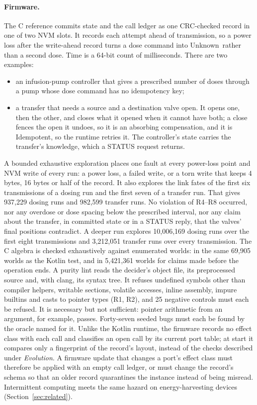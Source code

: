 \documentclass[11pt]{article}
\theoremstyle{definition}
\theoremstyle{plain}
\newcommand{\Unknown}{\textsf{Unknown}}
\newcommand{\Idem}{\textsf{Idempotent}}
\begin{document}
\paragraph{Firmware.} The C reference commits state and the call ledger as one CRC-checked record in one of two NVM slots. It records each attempt ahead of transmission, so a power loss after the write-ahead record turns a dose command into \Unknown\ rather than a second dose. Time is a 64-bit count of milliseconds. There are two examples:
\begin{itemize}[nosep]
  \item an infusion-pump controller that gives a prescribed number of doses through a pump whose dose command has no idempotency key;
  \item a transfer that needs a source and a destination valve open. It opens one, then the other, and closes what it opened when it cannot have both; a close fences the open it undoes, so it is an absorbing compensation, and it is \Idem, so the runtime retries it. The controller's state carries the transfer's knowledge, which a STATUS request returns.
\end{itemize}
A bounded exhaustive exploration places one fault at every power-loss point and NVM write of every run: a power loss, a failed write, or a torn write that keeps 4 bytes, 16 bytes or half of the record. It also explores the link fates of the first six transmissions of a dosing run and the first seven of a transfer run. That gives 937{,}229 dosing runs and 982{,}599 transfer runs. No violation of R4--R8 occurred, nor any overdose or dose spacing below the prescribed interval, nor any claim about the transfer, in committed state or in a STATUS reply, that the valves' final positions contradict. A deeper run explores 10{,}006{,}169 dosing runs over the first eight transmissions and 3{,}212{,}051 transfer runs over every transmission. The C algebra is checked exhaustively against enumerated worlds: in the same 69{,}905 worlds as the Kotlin test, and in 5{,}421{,}361 worlds for claims made before the operation ends. A purity lint reads the decider's object file, its preprocessed source and, with clang, its syntax tree. It refuses undefined symbols other than compiler helpers, writable sections, volatile accesses, inline assembly, impure builtins and casts to pointer types (R1, R2), and 25 negative controls must each be refused. It is necessary but not sufficient: pointer arithmetic from an argument, for example, passes. Forty-seven seeded bugs must each be found by the oracle named for it. Unlike the Kotlin runtime, the firmware records no effect class with each call and classifies an open call by its current port table; at start it compares only a fingerprint of the record's layout, instead of the checks described under \emph{Evolution}. A firmware update that changes a port's effect class must therefore be applied with an empty call ledger, or must change the record's schema so that an older record quarantines the instance instead of being misread. Intermittent computing meets the same hazard on energy-harvesting devices (Section~\ref{sec:related}).
\end{document}
